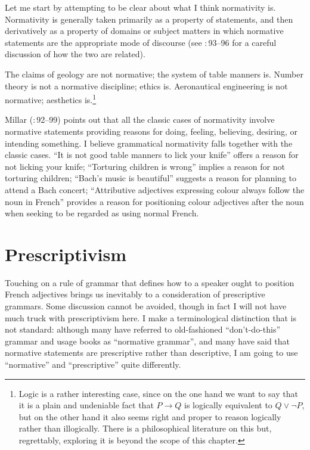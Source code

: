 \documentclass[output=paper]{langscibook}
\begin{document}
Let me start by attempting to be clear about what I think normativity is. Normativity is generally taken primarily as a property of statements, and then derivatively as a property of domains or subject matters in which normative statements are the appropriate mode of discourse (see \citealt{Millar04}:\,93--96 for a careful discussion of how the two are related).

The claims of geology are not normative; the system of table manners is. Number theory is not a normative discipline; ethics is. Aeronautical engineering is not normative; aesthetics is.\footnote{Logic is a rather interesting case, since on the one hand we want to say that it is a plain and undeniable fact that $P \rightarrow Q$ is logically equivalent to $Q \vee \neg P$, but on the other hand it also seems right and proper to reason logically rather than illogically. There is a philosophical literature on this but, regrettably, exploring it is  beyond the scope of this chapter.}

Millar (\citeyear{Millar04}:\,92--99) points out that all the classic cases of normativity involve normative statements providing reasons for doing, feeling, believing, desiring, or intending something. I believe grammatical normativity falls together with the classic cases. ``It is not good table manners to lick your knife'' offers a reason for not licking your knife; ``Torturing children is wrong'' implies a reason for not torturing children; ``Bach's music is beautiful'' suggests a reason for planning to attend a Bach concert; ``Attributive adjectives expressing colour always follow the noun in French'' provides a reason for positioning colour adjectives after the noun when seeking to be regarded as using normal French.

\section{Prescriptivism}
\label{sec:pullum:prescriptivism}

Touching on a rule of grammar that defines how to a speaker ought to position French adjectives brings us inevitably to a consideration of prescriptive grammars. Some discussion cannot be avoided, though in fact I will not have much truck with prescriptivism here. I make a terminological distinction that is not standard: although many have referred to old-fashioned ``don't-do-this'' grammar and usage books as ``normative grammar'', and many have said that normative statements are prescriptive rather than descriptive, I am going to use ``normative'' and ``prescriptive'' quite differently.
\end{document}
